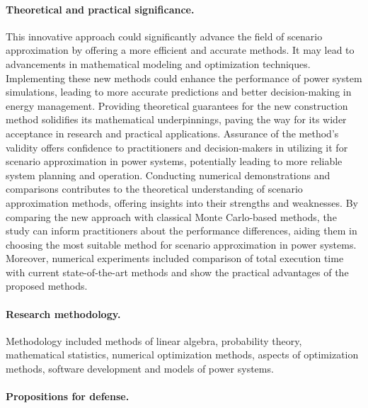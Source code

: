 \paragraph{Theoretical and practical significance.}


This innovative approach could significantly advance the field of scenario approximation by offering a more efficient and accurate methods. It may lead to advancements in mathematical modeling and optimization techniques. Implementing these new methods could enhance the performance of power system simulations, leading to more accurate predictions and better decision-making in energy management. Providing theoretical guarantees for the new construction method solidifies its mathematical underpinnings, paving the way for its wider acceptance in research and practical applications. Assurance of the method's validity offers confidence to practitioners and decision-makers in utilizing it for scenario approximation in power systems, potentially leading to more reliable system planning and operation. Conducting numerical demonstrations and comparisons contributes to the theoretical understanding of scenario approximation methods, offering insights into their strengths and weaknesses. By comparing the new approach with classical Monte Carlo-based methods, the study can inform practitioners about the performance differences, aiding them in choosing the most suitable method for scenario approximation in power systems. Moreover, numerical experiments included comparison of total execution time with current state-of-the-art methods and show the practical advantages of the proposed methods.

\paragraph{Research methodology.}


Methodology included methods of linear algebra, probability theory, mathematical statistics, numerical optimization methods, aspects of optimization methods, software development and models of power systems.

\newpage

\paragraph{Propositions for defense.}


